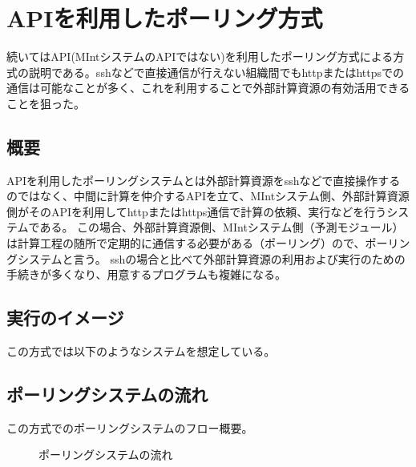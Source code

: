 \documentclass[letterpaper,10pt,dvipdfmx,openany]{sphinxmanual}
\begin{document}
\newpage


\section{APIを利用したポーリング方式}
\label{\detokenize{using_distributed_properties:api}}
続いてはAPI(MIntシステムのAPIではない)を利用したポーリング方式による方式の説明である。sshなどで直接通信が行えない組織間でもhttpまたはhttpsでの通信は可能なことが多く、これを利用することで外部計算資源の有効活用できることを狙った。


\subsection{概要}
\label{\detokenize{using_distributed_properties:id15}}
APIを利用したポーリングシステムとは外部計算資源をsshなどで直接操作するのではなく、中間に計算を仲介するAPIを立て、MIntシステム側、外部計算資源側がそのAPIを利用してhttpまたはhttps通信で計算の依頼、実行などを行うシステムである。
この場合、外部計算資源側、MIntシステム側（予測モジュール）は計算工程の随所で定期的に通信する必要がある（ポーリング）ので、ポーリングシステムと言う。
sshの場合と比べて外部計算資源の利用および実行のための手続きが多くなり、用意するプログラムも複雑になる。

\newpage


\subsection{実行のイメージ}
\label{\detokenize{using_distributed_properties:id16}}
この方式では以下のようなシステムを想定している。

\begin{figure}[htbp]
\centering

\noindent{}
\end{figure}



\newpage


\subsection{ポーリングシステムの流れ}
\label{\detokenize{using_distributed_properties:id17}}
この方式でのポーリングシステムのフロー概要。

\begin{figure}[htbp]
\centering
\capstart
\caption{ポーリングシステムの流れ}\label{\detokenize{using_distributed_properties:id46}}\end{figure}
\end{document}
